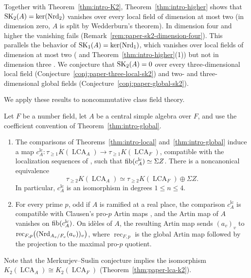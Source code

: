 Together with Theorem~\ref{thm:intro-K2}, Theorem~\ref{thm:intro-higher} shows that $\operatorname{SK}_2(A)=\ker(\operatorname{Nrd}_2)$ vanishes over every local field of dimension at most two (in dimension zero, $A$ is split by Wedderburn's theorem).
In dimension four and higher the vanishing fails (Remark~\ref{rem:paper-sk2-dimension-four}).
This parallels the behavior of $\operatorname{SK}_1(A)=\ker(\operatorname{Nrd}_1)$, which vanishes over local fields of dimension at most two (\cite{NakayamaMatsushima1943,HazratWadsworth} and Theorem~\ref{thm:intro-higher}(1)) but not in dimension three \cite{Platonov1976}.
We conjecture that $\operatorname{SK}_2(A)=0$ over every three-dimensional local field (Conjecture~\ref{conj:paper-three-local-sk2}) and two- and three-dimensional global fields (Conjecture~\ref{conj:paper-global-sk2}).

We apply these results to noncommutative class field theory.

\begin{introthm}\label{thm:intro-LCA}
Let $F$ be a number field, let $A$ be a central simple algebra over $F$, and use the coefficient convention of Theorem~\ref{thm:intro-global}.
\begin{enumerate}
\item The comparisons of Theorems~\ref{thm:intro-local} and~\ref{thm:intro-global} induce a map $c^{\mathrm{lc}}_A\colon\tau_{\ge1}K(\operatorname{LCA}_A)\to\tau_{\ge1}K(\operatorname{LCA}_F)$, compatible with the localization sequences of \cite{BHRAdeles}, such that $\operatorname{fib}(c^{\mathrm{lc}}_A)\simeq\Sigma Z$.
There is a noncanonical equivalence
\[
 \tau_{\ge2}K(\operatorname{LCA}_A)\simeq\tau_{\ge2}K(\operatorname{LCA}_F)\oplus\Sigma Z.
\]
In particular, $c^{\mathrm{lc}}_A$ is an isomorphism in degrees $1\le n\le4$.
\item For every prime $p$, odd if $A$ is ramified at a real place, the comparison $c^{\mathrm{lc}}_A$ is compatible with Clausen's pro-$p$ Artin maps \cite{ClausenArtin}, and the Artin map of $A$ vanishes on $\operatorname{fib}(c^{\mathrm{lc}}_A)$.
On id\`eles of $A$, the resulting Artin map sends $(a_v)_v$ to $\operatorname{rec}_{F,p}\bigl((\operatorname{Nrd}_{A_v/F_v}(a_v))_v\bigr)$, where $\operatorname{rec}_{F,p}$ is the global Artin map followed by the projection to the maximal pro-$p$ quotient.
\end{enumerate}
\end{introthm}

Note that the Merkurjev--Suslin conjecture implies the isomorphism $K_2(\operatorname{LCA}_A)\cong K_2(\operatorname{LCA}_F)$ \cite[Theorem 10.5]{BHRAdeles} (Theorem~\ref{thm:paper-lca-k2}).


